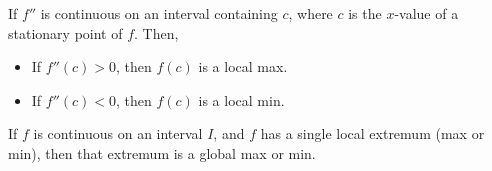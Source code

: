\begin{theorem}
  If $f''$ is continuous on an interval containing $c$, where $c$ is the $x$-value of a stationary point of $f$. Then,
  \begin{itemize}
    \item If $f''(c) > 0$, then $f(c)$ is a local max.
    \item If $f''(c) < 0$, then $f(c)$ is a local min.
  \end{itemize}
\end{theorem}

\begin{namedtheorem}
  If $f$ is continuous on an interval $I$, and $f$ has a single local extremum (max or min), then that extremum is a global max or min.
\end{namedtheorem}